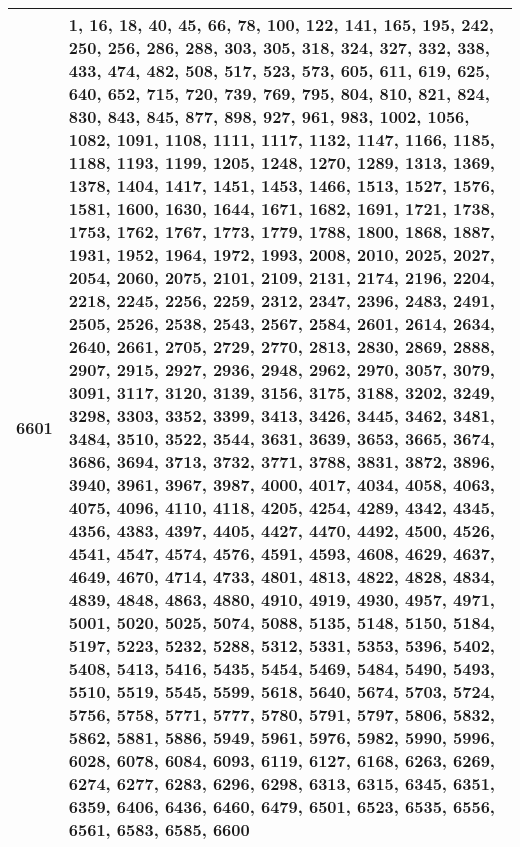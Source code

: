\documentclass[12pt]{article}
\begin{document}
\begin{tabular}{|c|p{15cm}|}
    6601 & \scriptsize{1, 16, 18, 40, 45, 66, 78, 100, 122, 141, 165, 195, 242, 250, 256, 286, 288, 303, 305, 318, 324, 327, 332, 338, 433, 474, 482, 508, 517, 523, 573, 605, 611, 619, 625, 640, 652, 715, 720, 739, 769, 795, 804, 810, 821, 824, 830, 843, 845, 877, 898, 927, 961, 983, 1002, 1056, 1082, 1091, 1108, 1111, 1117, 1132, 1147, 1166, 1185, 1188, 1193, 1199, 1205, 1248, 1270, 1289, 1313, 1369, 1378, 1404, 1417, 1451, 1453, 1466, 1513, 1527, 1576, 1581, 1600, 1630, 1644, 1671, 1682, 1691, 1721, 1738, 1753, 1762, 1767, 1773, 1779, 1788, 1800, 1868, 1887, 1931, 1952, 1964, 1972, 1993, 2008, 2010, 2025, 2027, 2054, 2060, 2075, 2101, 2109, 2131, 2174, 2196, 2204, 2218, 2245, 2256, 2259, 2312, 2347, 2396, 2483, 2491, 2505, 2526, 2538, 2543, 2567, 2584, 2601, 2614, 2634, 2640, 2661, 2705, 2729, 2770, 2813, 2830, 2869, 2888, 2907, 2915, 2927, 2936, 2948, 2962, 2970, 3057, 3079, 3091, 3117, 3120, 3139, 3156, 3175, 3188, 3202, 3249, 3298, 3303, 3352, 3399, 3413, 3426, 3445, 3462, 3481, 3484, 3510, 3522, 3544, 3631, 3639, 3653, 3665, 3674, 3686, 3694, 3713, 3732, 3771, 3788, 3831, 3872, 3896, 3940, 3961, 3967, 3987, 4000, 4017, 4034, 4058, 4063, 4075, 4096, 4110, 4118, 4205, 4254, 4289, 4342, 4345, 4356, 4383, 4397, 4405, 4427, 4470, 4492, 4500, 4526, 4541, 4547, 4574, 4576, 4591, 4593, 4608, 4629, 4637, 4649, 4670, 4714, 4733, 4801, 4813, 4822, 4828, 4834, 4839, 4848, 4863, 4880, 4910, 4919, 4930, 4957, 4971, 5001, 5020, 5025, 5074, 5088, 5135, 5148, 5150, 5184, 5197, 5223, 5232, 5288, 5312, 5331, 5353, 5396, 5402, 5408, 5413, 5416, 5435, 5454, 5469, 5484, 5490, 5493, 5510, 5519, 5545, 5599, 5618, 5640, 5674, 5703, 5724, 5756, 5758, 5771, 5777, 5780, 5791, 5797, 5806, 5832, 5862, 5881, 5886, 5949, 5961, 5976, 5982, 5990, 5996, 6028, 6078, 6084, 6093, 6119, 6127, 6168, 6263, 6269, 6274, 6277, 6283, 6296, 6298, 6313, 6315, 6345, 6351, 6359, 6406, 6436, 6460, 6479, 6501, 6523, 6535, 6556, 6561, 6583, 6585, 6600} \\
    \hline
\end{tabular}
\\
\end{document}
